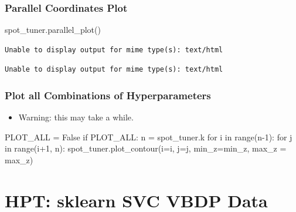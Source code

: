 \documentclass[
  letterpaper,
  DIV=11,
  numbers=noendperiod]{scrreprt}
\newenvironment{Shaded}{\begin{snugshade}}{\end{snugshade}}
\newcommand{\BuiltInTok}[1]{\textcolor[rgb]{0.00,0.23,0.31}{#1}}
\newcommand{\ControlFlowTok}[1]{\textcolor[rgb]{0.00,0.23,0.31}{#1}}
\newcommand{\DecValTok}[1]{\textcolor[rgb]{0.68,0.00,0.00}{#1}}
\newcommand{\KeywordTok}[1]{\textcolor[rgb]{0.00,0.23,0.31}{#1}}
\newcommand{\NormalTok}[1]{\textcolor[rgb]{0.00,0.23,0.31}{#1}}
\newcommand{\OperatorTok}[1]{\textcolor[rgb]{0.37,0.37,0.37}{#1}}
\newcommand{\VariableTok}[1]{\textcolor[rgb]{0.07,0.07,0.07}{#1}}
\providecommand{\tightlist}{%
  \setlength{\itemsep}{0pt}\setlength{\parskip}{0pt}}\usepackage{longtable,booktabs,array}
\begin{document}
\hypertarget{parallel-coordinates-plot-2}{%
\subsection{Parallel Coordinates
Plot}\label{parallel-coordinates-plot-2}}

\begin{Shaded}
\begin{Highlighting}[]
\NormalTok{spot\_tuner.parallel\_plot()}
\end{Highlighting}
\end{Shaded}

\begin{verbatim}
Unable to display output for mime type(s): text/html
\end{verbatim}

\begin{verbatim}
Unable to display output for mime type(s): text/html
\end{verbatim}

\hypertarget{plot-all-combinations-of-hyperparameters-2}{%
\subsection{Plot all Combinations of
Hyperparameters}\label{plot-all-combinations-of-hyperparameters-2}}

\begin{itemize}
\tightlist
\item
  Warning: this may take a while.
\end{itemize}

\begin{Shaded}
\begin{Highlighting}[]
\NormalTok{PLOT\_ALL }\OperatorTok{=} \VariableTok{False}
\ControlFlowTok{if}\NormalTok{ PLOT\_ALL:}
\NormalTok{    n }\OperatorTok{=}\NormalTok{ spot\_tuner.k}
    \ControlFlowTok{for}\NormalTok{ i }\KeywordTok{in} \BuiltInTok{range}\NormalTok{(n}\OperatorTok{{-}}\DecValTok{1}\NormalTok{):}
        \ControlFlowTok{for}\NormalTok{ j }\KeywordTok{in} \BuiltInTok{range}\NormalTok{(i}\OperatorTok{+}\DecValTok{1}\NormalTok{, n):}
\NormalTok{            spot\_tuner.plot\_contour(i}\OperatorTok{=}\NormalTok{i, j}\OperatorTok{=}\NormalTok{j, min\_z}\OperatorTok{=}\NormalTok{min\_z, max\_z }\OperatorTok{=}\NormalTok{ max\_z)}
\end{Highlighting}
\end{Shaded}

\hypertarget{sec-hpt-sklearn-svc-vbdp-data}{%
\chapter{HPT: sklearn SVC VBDP
Data}\label{sec-hpt-sklearn-svc-vbdp-data}}
\end{document}
